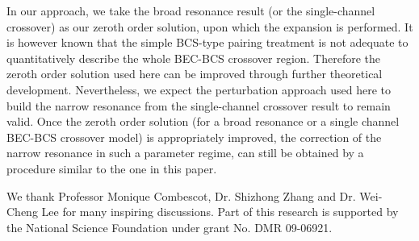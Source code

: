 \documentclass[reprint,pra]{revtex4-1}
\begin{document}


     In our approach, we take the broad resonance result (or the single-channel crossover) as our zeroth order solution, upon which the expansion is performed.  It is however known that the simple BCS-type pairing treatment is not adequate  to quantitatively describe the whole BEC-BCS crossover region.  Therefore the zeroth order solution used here can be improved through further theoretical development.  Nevertheless, we expect the perturbation approach used here to build the narrow resonance from the single-channel crossover result to remain valid.  Once the zeroth order solution (for a broad resonance or a single channel BEC-BCS crossover model) is appropriately improved, the correction of the narrow resonance in such a parameter regime, can still be obtained by  a procedure similar to the one in this paper.  


\begin{acknowledgements}
We thank  Professor Monique Combescot, Dr. Shizhong Zhang and  Dr. Wei-Cheng Lee for many inspiring discussions. Part of this research  is supported  by the National Science Foundation under grant No. DMR 09-06921. 
\end{acknowledgements}

\end{document}
